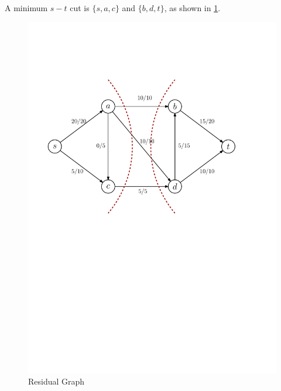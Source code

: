 \documentclass[12pt,letterpaper,titlepage,en-US]{article}
\begin{document}
\begin{homeworkProblem}
\begin{homeworkSubProblem}
\begin{homeworkSubProblem}
A minimum $s-t$ cut is $\{s,a,c\}$ and $\{b,d,t\}$, as shown in \cref{p3c}.
\begin{figure}[H]
    \caption{Residual Graph}\label{p3c}
    \centering
    \includegraphics[width=.7\textwidth]{p3c}
\end{figure}
\end{homeworkSubProblem}
\end{homeworkSubProblem}
\end{homeworkProblem}
\end{document}
